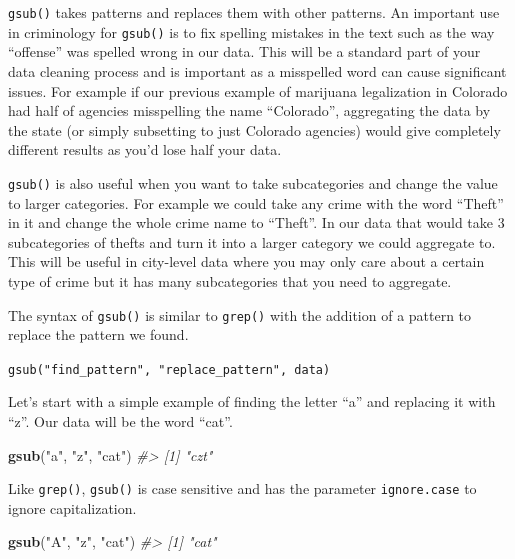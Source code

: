 \documentclass[
  12pt,
]{book}
\newenvironment{Shaded}{\begin{snugshade}}{\end{snugshade}}
\newcommand{\CommentTok}[1]{\textcolor[rgb]{0.37,0.37,0.37}{\textit{#1}}}
\newcommand{\KeywordTok}[1]{\textcolor[rgb]{0.27,0.27,0.27}{\textbf{#1}}}
\newcommand{\NormalTok}[1]{#1}
\newcommand{\StringTok}[1]{\textcolor[rgb]{0.5,0.5,0.5}{#1}}
\begin{document}
\texttt{gsub()} takes patterns and replaces them with other patterns. An important use in criminology for \texttt{gsub()} is to fix spelling mistakes in the text such as the way ``offense'' was spelled wrong in our data. This will be a standard part of your data cleaning process and is important as a misspelled word can cause significant issues. For example if our previous example of marijuana legalization in Colorado had half of agencies misspelling the name ``Colorado'', aggregating the data by the state (or simply subsetting to just Colorado agencies) would give completely different results as you'd lose half your data.

\texttt{gsub()} is also useful when you want to take subcategories and change the value to larger categories. For example we could take any crime with the word ``Theft'' in it and change the whole crime name to ``Theft''. In our data that would take 3 subcategories of thefts and turn it into a larger category we could aggregate to. This will be useful in city-level data where you may only care about a certain type of crime but it has many subcategories that you need to aggregate.

The syntax of \texttt{gsub()} is similar to \texttt{grep()} with the addition of a pattern to replace the pattern we found.

\texttt{gsub("find\_pattern",\ "replace\_pattern",\ data)}

Let's start with a simple example of finding the letter ``a'' and replacing it with ``z''. Our data will be the word ``cat''.

\begin{Shaded}
\begin{Highlighting}[]
\KeywordTok{gsub}\NormalTok{(}\StringTok{"a"}\NormalTok{, }\StringTok{"z"}\NormalTok{, }\StringTok{"cat"}\NormalTok{)}
\CommentTok{\#\textgreater{} [1] "czt"}
\end{Highlighting}
\end{Shaded}

Like \texttt{grep()}, \texttt{gsub()} is case sensitive and has the parameter \texttt{ignore.case} to ignore capitalization.

\begin{Shaded}
\begin{Highlighting}[]
\KeywordTok{gsub}\NormalTok{(}\StringTok{"A"}\NormalTok{, }\StringTok{"z"}\NormalTok{, }\StringTok{"cat"}\NormalTok{)}
\CommentTok{\#\textgreater{} [1] "cat"}
\end{Highlighting}
\end{Shaded}
\end{document}

